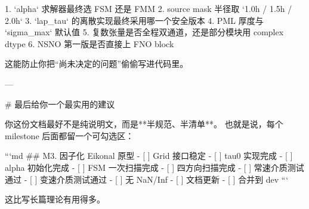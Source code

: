1. `alpha` 求解器最终选 FSM 还是 FMM
2. source mask 半径取 `1.0h / 1.5h / 2.0h`
3. `lap_tau` 的离散实现最终采用哪一个安全版本
4. PML 厚度与 `sigma_max` 默认值
5. 复数张量是否全程双通道，还是部分模块用 complex dtype
6. NSNO 第一版是否直接上 FNO block

这能防止你把“尚未决定的问题”偷偷写进代码里。

---

# 最后给你一个最实用的建议

你这份文档最好不是纯说明文，而是**半规范、半清单**。
也就是说，每个 milestone 后面都留一个可勾选区：

```md
## M3. 因子化 Eikonal 原型
- [ ] Grid 接口稳定
- [ ] tau0 实现完成
- [ ] alpha 初始化完成
- [ ] FSM 一次扫描完成
- [ ] 四方向扫描完成
- [ ] 常速介质测试通过
- [ ] 变速介质测试通过
- [ ] 无 NaN/Inf
- [ ] 文档更新
- [ ] 合并到 dev
```

这比写长篇理论有用得多。

